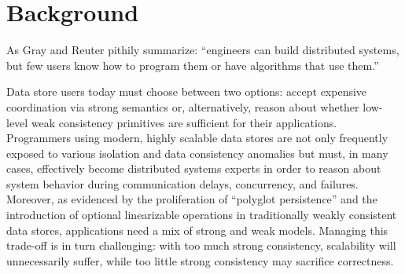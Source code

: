 
\section{Background}
\label{sec:motivation}

 As Gray and Reuter pithily
summarize: ``engineers can build distributed systems, but few users
know how to program them or have algorithms that use them.''

Data store users today must choose between two options: accept
expensive coordination via strong semantics or, alternatively, reason
about whether low-level weak consistency primitives are sufficient for
their applications.  Programmers using modern, highly
scalable data stores are not only frequently exposed to various
isolation and data consistency anomalies but must, in many cases,
effectively become distributed systems experts in order to reason
about system behavior during communication delays, concurrency, and
failures. Moreover, as evidenced by the proliferation of ``polyglot
persistence'' and the introduction of optional linearizable operations
in traditionally weakly consistent data stores, applications need a
mix of strong and weak models. Managing this trade-off is in turn
challenging: with too much strong consistency, scalability will
unnecessarily suffer, while too little strong consistency may
sacrifice correctness.
